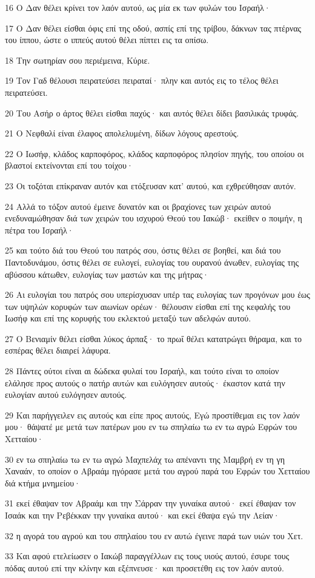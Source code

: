 \par 16 Ο Δαν θέλει κρίνει τον λαόν αυτού, ως μία εκ των φυλών του Ισραήλ·
\par 17 Ο Δαν θέλει είσθαι όφις επί της οδού, ασπίς επί της τρίβου, δάκνων τας πτέρνας του ίππου, ώστε ο ιππεύς αυτού θέλει πίπτει εις τα οπίσω.
\par 18 Την σωτηρίαν σου περιέμεινα, Κύριε.
\par 19 Τον Γαδ θέλουσι πειρατεύσει πειραταί· πλην και αυτός εις το τέλος θέλει πειρατεύσει.
\par 20 Του Ασήρ ο άρτος θέλει είσθαι παχύς· και αυτός θέλει δίδει βασιλικάς τρυφάς.
\par 21 Ο Νεφθαλί είναι έλαφος απολελυμένη, δίδων λόγους αρεστούς.
\par 22 Ο Ιωσήφ, κλάδος καρποφόρος, κλάδος καρποφόρος πλησίον πηγής, του οποίου οι βλαστοί εκτείνονται επί του τοίχου·
\par 23 Οι τοξόται επίκραναν αυτόν και ετόξευσαν κατ' αυτού, και εχθρεύθησαν αυτόν.
\par 24 Αλλά το τόξον αυτού έμεινε δυνατόν και οι βραχίονες των χειρών αυτού ενεδυναμώθησαν διά των χειρών του ισχυρού Θεού του Ιακώβ· εκείθεν ο ποιμήν, η πέτρα του Ισραήλ·
\par 25 και τούτο διά του Θεού του πατρός σου, όστις θέλει σε βοηθεί, και διά του Παντοδυνάμου, όστις θέλει σε ευλογεί, ευλογίας του ουρανού άνωθεν, ευλογίας της αβύσσου κάτωθεν, ευλογίας των μαστών και της μήτρας·
\par 26 Αι ευλογίαι του πατρός σου υπερίσχυσαν υπέρ τας ευλογίας των προγόνων μου έως των υψηλών κορυφών των αιωνίων ορέων· θέλουσιν είσθαι επί της κεφαλής του Ιωσήφ και επί της κορυφής του εκλεκτού μεταξύ των αδελφών αυτού.
\par 27 Ο Βενιαμίν θέλει είσθαι λύκος άρπαξ· το πρωΐ θέλει κατατρώγει θήραμα, και το εσπέρας θέλει διαιρεί λάφυρα.
\par 28 Πάντες ούτοι είναι αι δώδεκα φυλαί του Ισραήλ, και τούτο είναι το οποίον ελάλησε προς αυτούς ο πατήρ αυτών και ευλόγησεν αυτούς· έκαστον κατά την ευλογίαν αυτού ευλόγησεν αυτούς.
\par 29 Και παρήγγειλεν εις αυτούς και είπε προς αυτούς, Εγώ προστίθεμαι εις τον λαόν μου· θάψατέ με μετά των πατέρων μου εν τω σπηλαίω τω εν τω αγρώ Εφρών του Χετταίου·
\par 30 εν τω σπηλαίω τω εν τω αγρώ Μαχπελάχ τω απέναντι της Μαμβρή εν τη γη Χαναάν, το οποίον ο Αβραάμ ηγόρασε μετά του αγρού παρά του Εφρών του Χετταίου διά κτήμα μνημείου·
\par 31 εκεί έθαψαν τον Αβραάμ και την Σάρραν την γυναίκα αυτού· εκεί έθαψαν τον Ισαάκ και την Ρεβέκκαν την γυναίκα αυτού· και εκεί έθαψα εγώ την Λείαν·
\par 32 η αγορά του αγρού και του σπηλαίου του εν αυτώ έγεινε παρά των υιών του Χετ.
\par 33 Και αφού ετελείωσεν ο Ιακώβ παραγγέλλων εις τους υιούς αυτού, έσυρε τους πόδας αυτού επί την κλίνην και εξέπνευσε· και προσετέθη εις τον λαόν αυτού.

